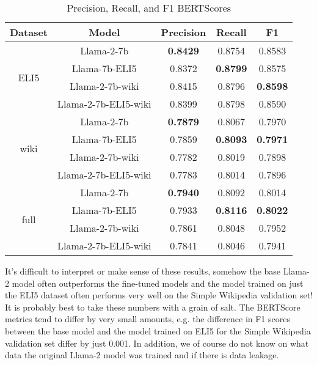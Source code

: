 \documentclass[11pt, oneside]{article}   	%
\begin{document}
\begin{table}[htbp]
\centering
\begin{tabular}{ccccc}
\toprule
\textbf{Dataset} & \textbf{Model} & \textbf{Precision} & \textbf{Recall} & \textbf{F1} \\
\midrule
\multirow{4}{*}{ELI5} & Llama-2-7b & \textbf{0.8429} & 0.8754 & 0.8583 \\
& Llama-7b-ELI5 & 0.8372 & \textbf{0.8799} & 0.8575 \\
& Llama-2-7b-wiki & 0.8415 & 0.8796 & \textbf{0.8598} \\
& Llama-2-7b-ELI5-wiki & 0.8399 & 0.8798 & 0.8590 \\
\midrule
\multirow{4}{*}{wiki} & Llama-2-7b & \textbf{0.7879} & 0.8067 & 0.7970 \\
& Llama-7b-ELI5 & 0.7859 & \textbf{0.8093} & \textbf{0.7971} \\
& Llama-2-7b-wiki & 0.7782 & 0.8019 & 0.7898 \\
& Llama-2-7b-ELI5-wiki & 0.7783 & 0.8014 & 0.7896 \\
\midrule
\multirow{4}{*}{full} & Llama-2-7b & \textbf{0.7940} & 0.8092 & 0.8014 \\
& Llama-7b-ELI5 & 0.7933 & \textbf{0.8116} & \textbf{0.8022} \\
& Llama-2-7b-wiki  & 0.7861 & 0.8048 & 0.7952 \\
& Llama-2-7b-ELI5-wiki & 0.7841 & 0.8046 & 0.7941 \\
\bottomrule
\end{tabular}
\caption{Precision, Recall, and F1 BERTScores}
\label{tab:scores}
\end{table}

It's difficult to interpret or make sense of these results, somehow the base Llama-2 model often outperforms the fine-tuned models and the model trained on just the ELI5 dataset often performs very well on the Simple Wikipedia validation set!
It is probably best to take these numbers with a grain of salt. The BERTScore metrics tend to differ by very small amounts, e.g. the difference in F1 scores between the base model and the model trained on ELI5 for the Simple Wikipedia validation set differ by just 0.001.
In addition, we of course do not know on what data the original Llama-2 model was trained and if there is data leakage.
\end{document}
